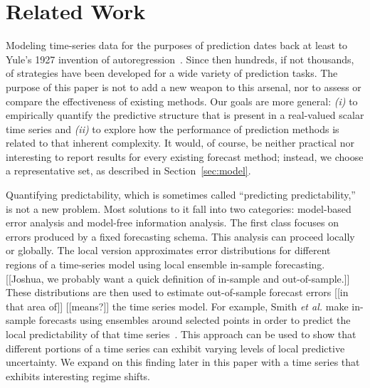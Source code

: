 \section{Related Work }\label{sec:related}

Modeling time-series data for the purposes of prediction dates back at
least to Yule's 1927 invention of autoregression~\cite{Yule27}.  Since
then hundreds, if not thousands, of strategies have been developed for
a wide variety of prediction tasks.  The purpose of this paper is not
to add a new weapon to this arsenal, nor to assess or compare the
effectiveness of existing methods.  Our goals are more general: {\sl
  (i)} to empirically quantify the predictive structure that is
present in a real-valued scalar time series and {\sl (ii)} to explore
how the performance of prediction methods is related to that inherent
complexity.  It would, of course, be neither practical nor interesting
to report results for every existing forecast method; instead, we
choose a representative set, as described in Section~\ref{sec:model}.

Quantifying predictability, which is sometimes called ``predicting
predictability,'' is not a new problem.  Most solutions to it fall
into two categories: model-based error analysis and model-free
information analysis.
%
%
%
The first class focuses on errors produced by a fixed forecasting
schema.  This analysis can proceed locally or globally.  The local
version approximates error distributions for different regions of a
time-series model using local ensemble in-sample forecasting.
{\color{red}[[Joshua, we probably want a quick definition of in-sample
      and out-of-sample.]]} These distributions are then used to
estimate out-of-sample forecast errors {\color{red}[[in that area of]]
  [[means?]]} the time series model.  For example, Smith {\sl et al.}
make in-sample forecasts using ensembles around selected points in
order to predict the local predictability of that time
series~\cite{Smith199250}.  This approach can be used to show that
different portions of a time series can exhibit varying levels of
local predictive uncertainty.  We expand on this finding later in this
paper with a time series that exhibits interesting regime shifts.

